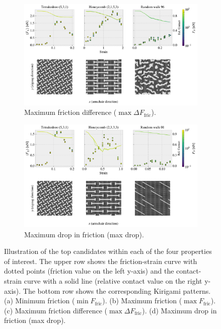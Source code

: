 \begin{figure}[H]\ContinuedFloat
  \centering
  \begin{subfigure}[t]{1\textwidth}
      \centering
      \includegraphics[width=\linewidth]{figures/stretch_profiles/PP_max_diff.pdf}
      \caption{Maximum friction difference ($\max \Delta F_{\text{fric}}$).}
      \label{fig:PP_max_diff}
  \end{subfigure}
  \hfill
  \vspace{1cm}
  \begin{subfigure}[t]{1\textwidth}
      \centering
      \includegraphics[width=\linewidth]{figures/stretch_profiles/PP_max_drop.pdf}
      \caption{Maximum drop in friction (max drop).}
      \label{fig:PP_max_drop}
  \end{subfigure}
  \hfill
  \caption{Illustration of the top candidates within each of the four properties of interest. The upper row shows the friction-strain curve with dotted points (friction value on the left y-axis) and the contact-strain curve with a solid line (relative contact value on the right y-axis). The bottom row shows the corresponding Kirigami patterns. (a) Minimum friction ($\min F_{\text{fric}}$). (b) Maximum friction ($\max F_{\text{fric}}$). (c) Maximum friction difference ($\max \Delta F_{\text{fric}}$).  (d) Maximum drop in friction (max drop). }
  \label{fig:PP}
\end{figure}


